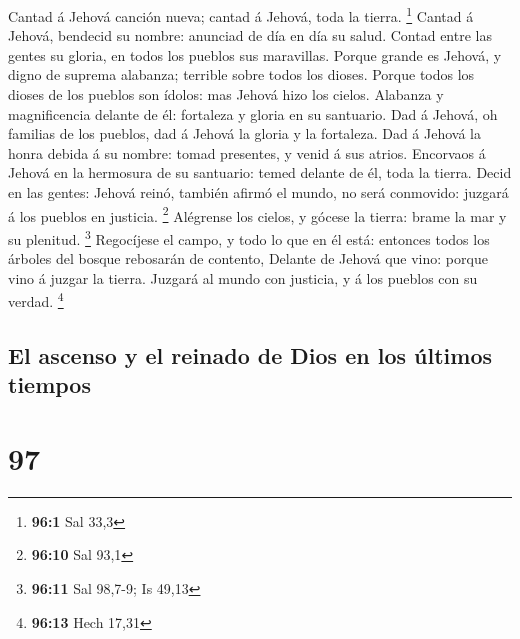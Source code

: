  Cantad á Jehová canción nueva; cantad á Jehová, toda la
tierra. \footnote{\textbf{96:1} Sal 33,3}  Cantad á Jehová,
bendecid su nombre: anunciad de día en día su salud.  Contad
entre las gentes su gloria, en todos los pueblos sus maravillas.
 Porque grande es Jehová, y digno de suprema alabanza;
terrible sobre todos los dioses.  Porque todos los dioses de
los pueblos son ídolos: mas Jehová hizo los cielos. 
Alabanza y magnificencia delante de él: fortaleza y gloria en su
santuario.  Dad á Jehová, oh familias de los pueblos, dad á
Jehová la gloria y la fortaleza.  Dad á Jehová la honra
debida á su nombre: tomad presentes, y venid á sus atrios. 
Encorvaos á Jehová en la hermosura de su santuario: temed delante de él,
toda la tierra.  Decid en las gentes: Jehová reinó, también
afirmó el mundo, no será conmovido: juzgará á los pueblos en justicia.
\footnote{\textbf{96:10} Sal 93,1}  Alégrense los cielos, y
gócese la tierra: brame la mar y su plenitud. \footnote{\textbf{96:11}
  Sal 98,7-9; Is 49,13}  Regocíjese el campo, y todo lo que
en él está: entonces todos los árboles del bosque rebosarán de contento,
 Delante de Jehová que vino: porque vino á juzgar la
tierra. Juzgará al mundo con justicia, y á los pueblos con su verdad.
\footnote{\textbf{96:13} Hech 17,31}

\hypertarget{el-ascenso-y-el-reinado-de-dios-en-los-uxfaltimos-tiempos}{%
\subsection{El ascenso y el reinado de Dios en los últimos
tiempos}\label{el-ascenso-y-el-reinado-de-dios-en-los-uxfaltimos-tiempos}}

\hypertarget{section-96}{%
\section{97}\label{section-96}}

